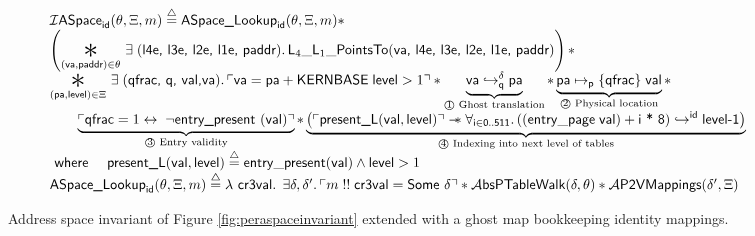 \begin{figure*}
\footnotesize
\[
\begin{array}{l}
  \mathcal{I}\textsf{ASpace}_{\textsf{id}}(\ptablestore,\Xi,m)\stackrel{\triangle}{=} \textsf{ASpace\_Lookup}_{\textsf{id}}(\ptablestore,\Xi,m) \ast\\  %
  \left(\bigast{(\vaddr, \textsf{paddr})\in \ptablestore}{\exists\;(\textsf{l4e, l3e, l2e, l1e, paddr})\ldotp \textsf{L}_{4}\_\textsf{L}_{1}\_\textsf{PointsTo}(\vaddr\textsf{, l4e, l3e, l2e, l1e, paddr})}\right)\ast \\
  \bigast{(\paddr,\mathsf{level}) \in \Xi}{\exists\; (\textsf{qfrac, q, val,}\vaddr) \ldotp \ulcorner \vaddr = \paddr + \textsf{KERNBASE} \; \textsf{level} > 1\urcorner \ast  \underbrace{\fracghostmaptoken{\delta}{\vaddr}{\paddr}{\qfrac} }_\text{\textcircled{1} Ghost translation} \ast \underbrace{\paddr \mapsto_{\mathsf{p}}\{\textsf{qfrac}\}\; \vale}_\text{\textcircled{2} Physical location}} \ast\\
   \qquad\underbrace{ \ulcorner \textsf{qfrac} = 1 \leftrightarrow \; \lnot\textsf{entry\_present }(\vale) \urcorner}_\text{\textcircled{3} Entry validity}\ast 
    \underbrace{\left(\ulcorner\textsf{present\_L}(\vale,\mathsf{level})\urcorner \wand \forall_{\textsf{i}\in\textsf{0..511}} \ldotp \ghostmaptoken{\textsf{id}}{((\mathsf{entry\_page}\;\vale) + \textsf{i * 8})}{\textsf{level-1}}\right)}_{\text{\textcircled{4} Indexing into next level of tables}} \\
  \textsf{ where } \quad
  \textsf{present\_L}(\vale,\mathsf{level})\stackrel{\triangle}{=} \mathsf{entry\_present}(\vale)\land \mathsf{level} > 1\\
   \textsf{ASpace\_Lookup}_{\textsf{id}}(\ptablestore,\Xi,m) \stackrel{\triangle}{=} \lambda\textsf{ cr3val} \ldotp \; \exists \gammaPred,\gammaPred'\ldotp \ulcorner m \; !!\; \textsf{cr3val} = \textsf{Some } \gammaPred \urcorner \ast
   \ptableabswalk{\delta,\ptablestore} \ast \pvmapping{\delta',\Xi}
\end{array}
\]
\vspace{-1.5em}
\caption{Address space invariant of Figure \ref{fig:peraspaceinvariant} extended with a ghost map bookkeeping identity mappings. }
  \label{fig:peraspaceinvariant_with_p2v_extensionC}
\vspace{-1em}
\end{figure*}

